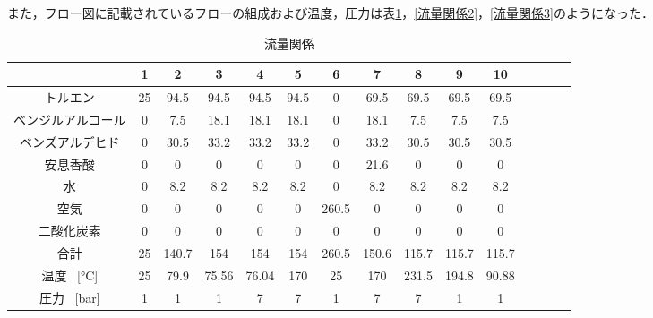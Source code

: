 \documentclass[a4j]{jsreport}
\begin{document}
また，フロー図に記載されているフローの組成および温度，圧力は表\ref{流量関係1}，\ref{流量関係2}，\ref{流量関係3}のようになった．
\begin{table}[htbp]
    \caption{流量関係}
    \label{流量関係1}
    \begin{center}
        \begin{tabular}{ccccccccccccccc}
          \hline
          [\si{\kilo \mole \per \hour}] & 1 & 2 & 3 & 4 & 5 & 6 & 7 & 8 & 9 & 10 \\
          \hline
          トルエン & 25 & 94.5 & 94.5 & 94.5 & 94.5 & 0 & 69.5 & 69.5 & 69.5 & 69.5 \\
          ベンジルアルコール & 0 & 7.5 & 18.1 & 18.1 & 18.1 & 0 & 18.1 & 7.5 & 7.5 & 7.5 \\
          ベンズアルデヒド & 0 & 30.5 & 33.2 & 33.2 & 33.2 & 0 & 33.2 & 30.5 & 30.5 & 30.5 \\
          安息香酸 & 0 & 0 & 0 & 0 & 0 & 0 & 21.6 & 0 & 0 & 0 \\
          水 & 0 & 8.2 & 8.2 & 8.2 & 8.2 & 0 & 8.2 & 8.2 & 8.2 & 8.2 \\
          空気 & 0 & 0 & 0 & 0 & 0 & 260.5 & 0 & 0 & 0 & 0 \\
          二酸化炭素 & 0 & 0 & 0 & 0 & 0 & 0 & 0 & 0 & 0 & 0 \\
          \hline
          合計 & 25 & 140.7 & 154 & 154 & 154 & 260.5 & 150.6 & 115.7 & 115.7 & 115.7 \\
          \hline
          温度 \, [\si{\degreeCelsius}] & 25 & 79.9 & 75.56 & 76.04 & 170 & 25 & 170 & 231.5 & 194.8 & 90.88 \\
          圧力 \, [\si{\bar}] & 1 & 1 & 1 & 7 & 7 & 1 & 7 & 7 & 1 & 1 \\
          \hline
        \end{tabular}
    \end{center}
\end{table}
\end{document}
